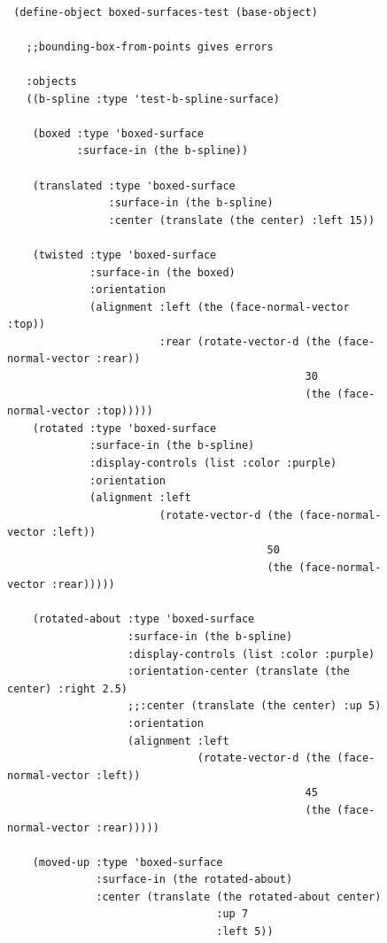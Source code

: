 \documentclass [11pt]{book}
\begin{document}
\begin{itemize}
\begin{description}
\end{description}




\begin{figure}
\begin{lrbox}{\boxedverb}
\begin{minipage}{\linewidth}
{\small

\begin{verbatim}

 (define-object boxed-surfaces-test (base-object)

   ;;bounding-box-from-points gives errors  
  
   :objects
   ((b-spline :type 'test-b-spline-surface)
   
    (boxed :type 'boxed-surface
           :surface-in (the b-spline))
   
    (translated :type 'boxed-surface
                :surface-in (the b-spline)
                :center (translate (the center) :left 15))
   
    (twisted :type 'boxed-surface
             :surface-in (the boxed)
             :orientation 
             (alignment :left (the (face-normal-vector :top))
                        :rear (rotate-vector-d (the (face-normal-vector :rear))
                                               30
                                               (the (face-normal-vector :top)))))
    (rotated :type 'boxed-surface
             :surface-in (the b-spline)
             :display-controls (list :color :purple)
             :orientation 
             (alignment :left 
                        (rotate-vector-d (the (face-normal-vector :left))
                                         50
                                         (the (face-normal-vector :rear)))))
    
    (rotated-about :type 'boxed-surface
                   :surface-in (the b-spline)
                   :display-controls (list :color :purple)
                   :orientation-center (translate (the center) :right 2.5)
                   ;;:center (translate (the center) :up 5)
                   :orientation 
                   (alignment :left 
                              (rotate-vector-d (the (face-normal-vector :left))
                                               45
                                               (the (face-normal-vector :rear)))))
    
    (moved-up :type 'boxed-surface
              :surface-in (the rotated-about)
              :center (translate (the rotated-about center) 
                                 :up 7
                                 :left 5))
   

\end{verbatim}}
\end{minipage}
\end{lrbox}
\end{figure}
\end{itemize}
\end{document}
